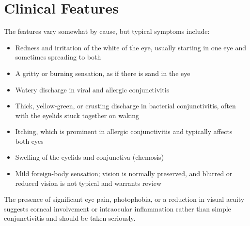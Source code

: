 \section*{Clinical Features}
The features vary somewhat by cause, but typical symptoms include:
\begin{itemize}
    \item Redness and irritation of the white of the eye, usually starting in one eye and sometimes spreading to both
    \item A gritty or burning sensation, as if there is sand in the eye
    \item Watery discharge in viral and allergic conjunctivitis
    \item Thick, yellow-green, or crusting discharge in bacterial conjunctivitis, often with the eyelids stuck together on waking
    \item Itching, which is prominent in allergic conjunctivitis and typically affects both eyes
    \item Swelling of the eyelids and conjunctiva (chemosis)
    \item Mild foreign-body sensation; vision is normally preserved, and blurred or reduced vision is not typical and warrants review
\end{itemize}
The presence of significant eye pain, photophobia, or a reduction in visual acuity suggests corneal involvement or intraocular inflammation rather than simple conjunctivitis and should be taken seriously.

